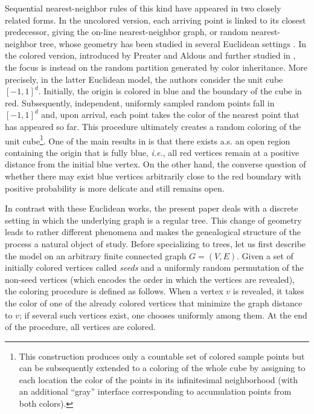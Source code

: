 \documentclass[french]{article}
\renewcommand{\1}{\mathds{1}}
\begin{document}
Sequential nearest-neighbor rules of this kind have appeared in two closely related forms. In the uncolored version, each arriving point is linked to its closest predecessor, giving the on-line nearest-neighbor graph, or random nearest-neighbor tree, whose geometry has been studied in several Euclidean settings \cite{PenroseWade2008,PenroseWade2009,LichevMitsche2024,Casse2025}. In the colored version, introduced by Preater and Aldous and further studied in \cite{Preater2009,Aldous18,BasdevantBlancCurienSingh}, the focus is instead on the random partition generated by color inheritance. More precisely, in the latter Euclidean model, the authors consider the unit cube $[-1,1]^d$. Initially, the origin is colored in blue and the boundary of the cube in red. Subsequently, independent, uniformly sampled random points fall in $[-1,1]^d$ and, upon arrival, each point takes the color of the nearest point that has appeared so far. This procedure ultimately creates a random coloring of the unit cube\footnote{This construction produces only a countable set of colored sample points but can be subsequently extended to a coloring of the whole cube by assigning to each location the color of the points in its infinitesimal neighborhood (with an additional ``gray'' interface corresponding to accumulation points from both colors).}. One of the main results in \cite{Preater2009, BasdevantBlancCurienSingh} is that there exists a.s. an open region containing the origin that is fully blue, \emph{i.e.}, all red vertices remain at a positive distance from the initial blue vertex. On the other hand, the converse question of whether there may exist blue vertices arbitrarily close to the red boundary with positive probability is more delicate and still remains open.

\medskip
In contrast with these Euclidean works, the present paper deals with a discrete setting in which the underlying graph is a regular tree. This change of geometry leads to rather different phenomena and makes the genealogical structure of the process a natural object of study. Before specializing to trees, let us first describe the model on an arbitrary finite connected graph $G=(V,E)$. Given a set of initially colored vertices called \emph{seeds} and a uniformly random permutation of the non-seed vertices (which encodes the order in which the vertices are revealed), the coloring procedure is defined as follows. When a vertex $v$ is revealed, it takes the color of one of the already colored vertices that minimize the graph distance to $v$; if several such vertices exist, one chooses uniformly among them. At the end of the procedure, all vertices are colored. 
\end{document}
